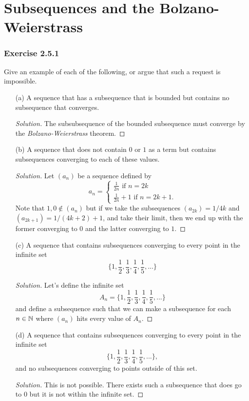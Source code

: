 \section{Subsequences and the Bolzano-Weierstrass}


\subsubsection{Exercise 2.5.1} Give an example of each of the following, or argue that such a request is impossible. 

\begin{enumerate}
    \item[(a)] A sequence that has a subsequence that is bounded but contains no subsequence that converges.
        \begin{proof}[Solution]
        The subsubsequence of the bounded subsequence must converge by the \textit{Bolzano-Weierstrass} theorem.
        \end{proof}
    \item[(b)] A sequence that does not contain \( 0 \) or \( 1\) as a term but contains subsequences converging to each of these values.
        \begin{proof}[Solution]
        Let \( (a_n)\) be a sequence defined by 
        \[ 
           a_n =  
            \begin{cases}
                \frac{1}{2n} \text{ if } n = 2k \\ 
                \frac{1}{2n} + 1 \text{ if } n = 2k + 1.
            \end{cases}
        \]
        Note that \( 1,0 \notin (a_n)\) but if we take the subsequences \( (a_{2k}) = 1 / 4k\) and \( (a_{2k+1}) = 1/(4k+2) + 1\), and take their limit, then we end up with the former converging to \( 0 \) and the latter converging to \( 1 \).

        \end{proof} 
    \item[(c)] A sequence that contains subsequences converging to every point in the infinite set 
        \[ \Big\{ 1 , \frac{1}{2} , \frac{1}{3}, \frac{1}{4}, \frac{1}{5},...\Big\}\]
        \begin{proof}[Solution]
         Let's define the infinite set  
         \[ A_n = \Big\{ 1, \frac{1}{2}, \frac{1}{3}, \frac{1}{4}, \frac{1}{5},... \Big\}\]
         and define a subsequence such that we can make a subsequence for each \( n \in \mathbb{N} \) where \( (a_n)\) hits every value of \( A_n\).
        \end{proof}
    \item[(d)] A sequence that contains subsequences converging to every point in the infinite set 
        \[ \Big\{1, \frac{1}{2}, \frac{1}{3}, \frac{1}{4}, \frac{1}{5},...\Big\},\]
        and no subsequences converging to points outside of this set.
        \begin{proof}[Solution]
          This is not possible. There exists such a subsequence that does go to \( 0 \) but it is not within the infinite set.
        \end{proof}
\end{enumerate}

